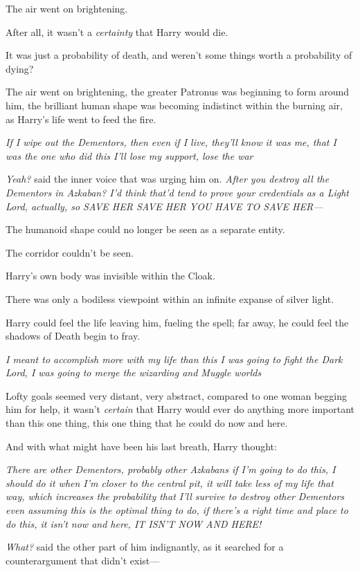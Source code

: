 The air went on brightening.

After all, it wasn't a \emph{certainty} that Harry would die.

It was just a probability of death, and weren't some things worth a probability
of dying?

The air went on brightening, the greater Patronus was beginning to form around
him, the brilliant human shape was becoming indistinct within the burning air,
as Harry's life went to feed the fire.

\emph{If I wipe out the Dementors, then even if I live, they'll know it was me,
that I was the one who did this{\el} I'll lose my support, lose the
war{\el}}

\emph{Yeah?} said the inner voice that was urging him on. \emph{After you
destroy all the Dementors in Azkaban? I'd think that'd tend to prove your
credentials as a Light Lord, actually, so SAVE HER SAVE HER YOU HAVE TO SAVE
HER—}

The humanoid shape could no longer be seen as a separate entity.

The corridor couldn't be seen.

Harry's own body was invisible within the Cloak.

There was only a bodiless viewpoint within an infinite expanse of silver light.

Harry could feel the life leaving him, fueling the spell; far away, he could
feel the shadows of Death begin to fray.

\emph{I meant to accomplish more with my life than this{\el} I was going to
fight the Dark Lord, I was going to merge the wizarding and Muggle
worlds{\el}}

Lofty goals seemed very distant, very abstract, compared to one woman begging
him for help, it wasn't \emph{certain} that Harry would ever do anything more
important than this one thing, this one thing that he could do now and here.

And with what might have been his last breath, Harry thought:

\emph{There are other Dementors, probably other Azkabans{\el} if I'm going
to do this, I should do it when I'm closer to the central pit, it will take
less of my life that way, which increases the probability that I'll survive to
destroy other Dementors{\el} even assuming this is the optimal thing to do,
if there's a right time and place to do this, it isn't now and here, IT ISN'T
NOW AND HERE!}

\emph{What?} said the other part of him indignantly, as it searched for a
counterargument that didn't exist—

